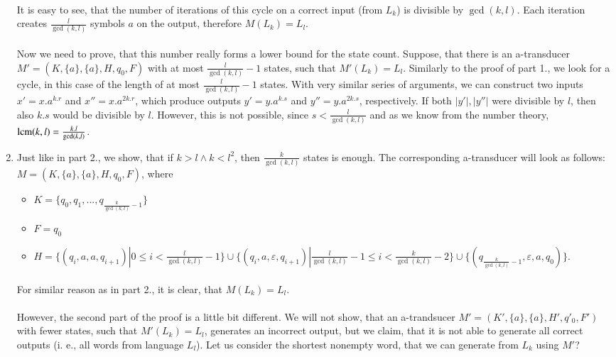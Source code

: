 \begin{enumerate}
\paragraph{}
It is easy to see, that the number of iterations of this cycle on a correct input (from $L_k$) is divisible by $\gcd(k,l)$. Each iteration creates $\frac{l}{\gcd(k,l)}$ symbols $a$ on the output, therefore $M(L_k) = L_l$.

\paragraph{}
Now we need to prove, that this number really forms a lower bound for the state count. Suppose, that there is an a-transducer $M' = (K, \{a\}, \{a\}, H, q_0, F)$ with at most $\frac{l}{\gcd(k,l)} -1$ states, such that $M'(L_k) = L_l$. Similarly to the proof of part 1., we look for a cycle, in this case of the length of at most $\frac{l}{\gcd(k,l)} - 1$ states. With very similar series of arguments, we can construct two inputs $x' = x.a^{k.r}$ and $x'' = x.a^{2k.r}$, which produce outputs $y' = y.a^{k.s}$ and $y'' = y.a^{2k.s}$, respectively. If both $|y'|, |y''|$ were divisible by $l$, then also $k.s$ would be divisible by $l$. However, this is not possible, since $s < \frac{l}{\gcd(k,l)}$ and as we know from the number theory, $\operatorname{lcm}(k,l) = \frac{k.l}{\gcd(k,l)}$.  

\item Just like in part 2., we show, that if $k > l \land k < l^2$, then $\frac{k}{\gcd(k,l)}$ states is enough. The corresponding a-transducer will look as follows: $M = (K, \{ a\}, \{ a\}, H, q_0, F)$, where 

\begin{itemize}
\item $K = \{ q_0, q_1,  ..., q_{\frac{k}{\gcd(k,l)}-1 }\}$
\item $F = q_0$
\item $H = \{(q_i, a, a, q_{i+1})| 0 \leq i < \frac{l}{\gcd(k,l)}-1 \} \cup \{(q_i, a, \varepsilon, q_{i+1})| \frac{l}{\gcd(k,l)}-1 \leq i < \frac{k}{\gcd(k,l)}-2 \} \cup \{ (q_{\frac{k}{\gcd(k,l)}-1}, \varepsilon, a, q_0) \}$.
\end{itemize}
\paragraph{}
For similar reason as in part 2., it is clear, that $M(L_k) = L_l$.

\paragraph{}
However, the second part of the proof is a little bit different. We will not show, that an a-trandsucer $M' = (K', \{a\}, \{a\}, H', q'_0, F')$ with fewer states, such that $M'(L_k) = L_l$, generates an incorrect output, but we claim, that it is not able to generate all correct outputs (i. e., all words from language $L_l$). Let us consider the shortest nonempty  word, that we can generate from $L_k$ using $M'$?


\end{enumerate}
